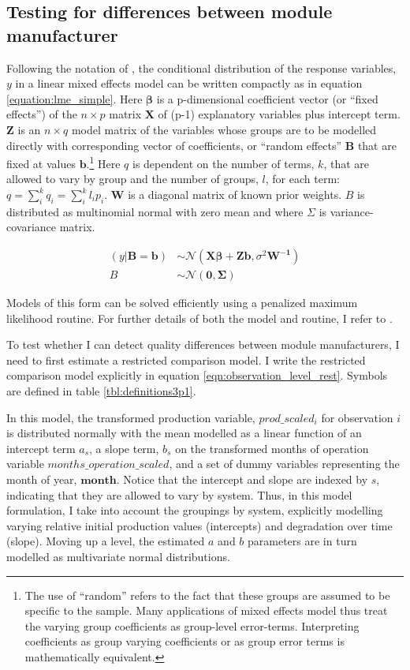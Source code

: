 \documentclass[a4paper]{article}
\begin{document}
\subsection{Testing for differences between module manufacturer}
Following the notation of \citet{bates_fitting_2015}, the conditional distribution of the response variables, $y$ in a linear mixed effects model can be written compactly as in equation \ref{equation:lme_simple}. Here $\mathbf{\beta}$ is a p-dimensional coefficient vector (or  ``fixed effects'') of the $n \times p$ matrix $\mathbf{X}$ of (p-1) explanatory variables plus intercept term. $\mathbf{Z}$ is an $n \times q$ model matrix of the variables whose groups are to be modelled directly with corresponding vector of coefficients, or ``random effects'' $\mathbf{B}$ that are fixed at values $\mathbf{b}$.\footnote{The use of ``random'' refers to the fact that these groups are assumed to be specific to the sample. Many applications of mixed effects model thus treat the varying group coefficients as group-level error-terms. Interpreting coefficients as group varying coefficients or as group error terms is mathematically equivalent.} Here $q$ is dependent on the number of terms, $k$, that are allowed to vary by group and the number of groups, $l$, for each term: $q=\sum_i^k q_i = \sum_i^k l_i p_i$.  $\mathbf{W}$ is a diagonal matrix of known prior weights. $B$ is distributed as multinomial normal with zero mean and where $\Sigma$ is variance-covariance matrix.

\begin{align}
(y|\mathbf{B=b}) &\sim \mathcal{N}(\mathbf{X\beta + Zb}, \sigma^2\mathbf{W^{-1}})\\
B &\sim \mathcal{N}(\mathbf{0,\Sigma})
\label{equation:lme_simple}
\end{align}

Models of this form can be solved efficiently using a penalized maximum likelihood routine. For further details of both the model and routine, I refer to \citet{bates_fitting_2015}.

To test whether I can detect quality differences between module manufacturers, I need to first estimate a restricted comparison model. I write the restricted comparison model explicitly in equation \ref{eqn:observation_level_rest}. Symbols are defined in table \ref{tbl:definitions3p1}.

In this model, the transformed production variable, $prod\_scaled_{i}$ for observation $i$ is distributed normally with the mean modelled as a linear function of an intercept term $a_s$, a slope term, $b_s$ on the transformed months of operation variable $months\_operation\_scaled$, and a set of dummy variables representing the month of year, $\mathbf{month}$. Notice that the intercept and slope are indexed by $s$, indicating that they are allowed to vary by system. Thus, in this model formulation, I take into account the groupings by system, explicitly modelling varying relative initial production values (intercepts) and degradation over time (slope). Moving up a level, the estimated $a$ and $b$ parameters are in turn modelled as multivariate normal distributions.
\end{document}
